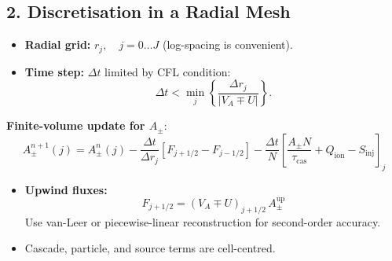 \begin{tcolorbox}[colframe=black, colback=white, title=Step-by-Step Coupling Scheme]

\section*{2. Discretisation in a Radial Mesh}

\begin{itemize}
    \item \textbf{Radial grid:} \( r_j, \quad j = 0 \dots J \) (log-spacing is convenient).
    \item \textbf{Time step:} \( \Delta t \) limited by CFL condition:
    \[
    \Delta t < \min_j \left\{ \frac{ \Delta r_j }{ | V_A \mp U | } \right\}.
    \]
\end{itemize}

\textbf{Finite-volume update for \( A_\pm \)}:
\[
A_\pm^{n+1}(j) = A_\pm^{n}(j) - \frac{ \Delta t }{ \Delta r_j } \left[ F_{j+1/2} - F_{j-1/2} \right]
- \frac{ \Delta t }{ N } \left[ \frac{A_\pm N}{\tau_{\text{cas}}} + Q_{\text{ion}} - S_{\text{inj}} \right]_j
\tag{2}
\]
\begin{itemize}
    \item \textbf{Upwind fluxes:}
    \[
    F_{j+1/2} = (V_A \mp U)_{j+1/2} \, A_\pm^{\text{up}}
    \]
    Use van-Leer or piecewise-linear reconstruction for second-order accuracy.
    \item Cascade, particle, and source terms are cell-centred.
\end{itemize}


\end{tcolorbox}

